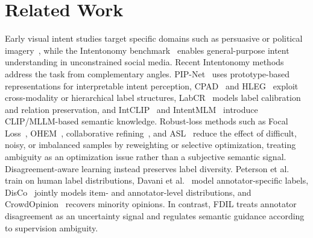 \section{Related Work}
\label{sec:related_work}

Early visual intent studies target specific domains such as persuasive or political imagery~\cite{joo_visual_2014,joo_automated_2015,huang_inferring_2016}, while the Intentonomy benchmark~\cite{jia_intentonomy_2021} enables general-purpose intent understanding in unconstrained social media. Recent Intentonomy methods address the task from complementary angles. PIP-Net~\cite{wang_prototype-based_2023} uses prototype-based representations for interpretable intent perception, CPAD~\cite{ye_cross-modality_2023} and HLEG~\cite{shi_learnable_2023} exploit cross-modality or hierarchical label structures, LabCR~\cite{shi_label-aware_2024} models label calibration and relation preservation, and IntCLIP~\cite{leonardis_synergy_2025} and IntentMLM~\cite{wang_unlocking_2026} introduce CLIP/MLLM-based semantic knowledge.  Robust-loss methods such as Focal Loss~\cite{lin_focal_2020}, OHEM~\cite{shrivastava_training_2016}, collaborative refining~\cite{ye_collaborative_2022}, and ASL~\cite{ridnik_asymmetric_2021} reduce the effect of difficult, noisy, or imbalanced samples by reweighting or selective optimization, treating ambiguity as an optimization issue rather than a subjective semantic signal. Disagreement-aware learning instead preserves label diversity. Peterson et al.~\cite{peterson_human_2019} train on human label distributions, Davani et al.~\cite{mostafazadeh_davani_dealing_2022} model annotator-specific labels, DisCo~\cite{weerasooriya_disagreement_2023} jointly models item- and annotator-level distributions, and CrowdOpinion~\cite{weerasooriya_subjective_2023} recovers minority opinions.  In contrast, FDIL treats annotator disagreement as an uncertainty signal and regulates semantic guidance according to supervision ambiguity.

